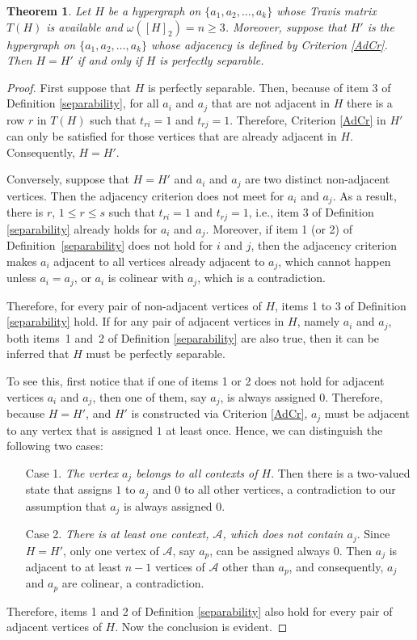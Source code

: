 \documentclass[%
12pt,
prereprint,
showpacs,
showkeys,
preprintnumbers,
amsmath,amssymb,
aps,
pra,
longbibliography,
notitlepage
]{revtex4-1}
\newtheorem{theorem}{{\color{THM} Theorem}}%
\theoremstyle{definition}
\begin{document}
	\begin{theorem}\label{reconstruct}
		Let $H$ be a hypergraph on $\{a_1, a_2,\ldots, a_k\}$ whose Travis matrix $T(H)$ is available and $\omega([H]_2 )=n\geq 3$. Moreover, suppose that $H'$ is the hypergraph on $\{a_1, a_2,\ldots, a_k\}$ whose adjacency is defined by Criterion \ref{AdCr}. Then $H=H'$ if and only if $H$ is perfectly separable.
	\end{theorem}
	\begin{proof}
		First suppose that $H$ is perfectly separable. Then, because of item 3 of Definition \ref{separability}, for all $a_i$ and $a_j$ that are not adjacent in $H$ there is a row $r$ in $T(H)$ such that $t_{r i}=1$ and $t_{r j}=1$. Therefore, Criterion \ref{AdCr} in $H'$ can only be satisfied for those vertices that are already adjacent in $H$. Consequently, $H=H'$.
		
		Conversely, suppose that $H=H'$ and $a_i$ and $a_j$ are two distinct non-adjacent vertices. Then the adjacency criterion does not meet for $a_i$ and $a_j$. As a result, there is $r$, $1\leq r\leq s$ such that $t_{ri}=1$ and $t_{rj}=1$, i.e., item 3 of Definition \ref{separability} already holds for $a_i$ and $a_j$. Moreover, if item 1 (or 2) of Definition~\ref{separability} does not hold for $i$ and $j$, then the adjacency criterion makes $a_i$ adjacent to all vertices already adjacent to $a_j$, which cannot happen unless $a_i = a_j$, or $a_i$ is colinear with $a_j$, which is a contradiction.
		
		Therefore, for every pair of non-adjacent vertices of $H$, items 1 to 3 of Definition \ref{separability} hold. If for any pair of adjacent vertices in $H$, namely $a_i$ and $a_j$, both items~1 and~2 of Definition \ref{separability} are also true, then it can be inferred that $H$ must be perfectly separable.
		
		To see this, first notice that if one of items 1 or 2 does not hold for adjacent vertices $a_i$ and $a_j$, then one of them, say $a_j$, is always assigned $0$. Therefore, because $H=H'$, and $H'$ is constructed via Criterion \ref{AdCr}, $a_j$ must be adjacent to any vertex that is assigned $1$ at least once. Hence, we can distinguish the following two cases:
		
		\begin{itemize}
			\item[Case 1.] \emph{The vertex $a_j$ belongs to all contexts of $H$}. Then there is a two-valued state that assigns $1$ to $a_j$ and $0$ to all other vertices, a contradiction to our assumption that $a_j$ is always assigned $0$.
			
			\item[Case 2.] \emph{There is at least one context, $\mathcal{A}$, which does not contain $a_j$}. Since $H=H'$, only one vertex of $\mathcal{A}$, say $a_p$, can be assigned always $0$. Then $a_j$ is adjacent to at least $n-1$ vertices of $\mathcal{A}$ other than $a_p$, and consequently, $a_j$ and $a_p$ are colinear, a contradiction.
		\end{itemize}
		Therefore, items 1 and 2 of Definition \ref{separability} also hold for every pair of adjacent vertices of $H$. Now the conclusion is evident.
	\end{proof}
	
\end{document}

